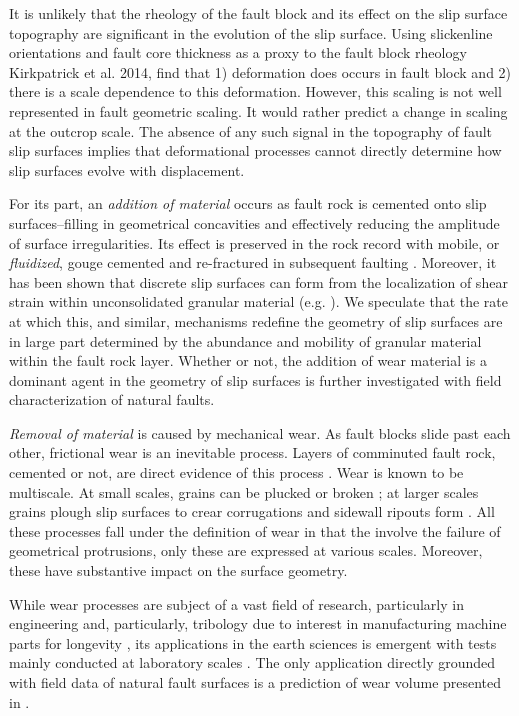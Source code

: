 \documentclass[12pt,a4paper]{article}
\begin{document}
It is unlikely that the rheology of the fault block and its effect on the slip surface topography are significant in the evolution of the slip surface. Using slickenline orientations and fault core thickness as a proxy to the fault block rheology Kirkpatrick et al. 2014, find that 1) deformation does occurs in fault block and 2) there is a scale dependence to this deformation. However, this scaling is not well represented in fault geometric scaling. It would rather predict a change in scaling at the outcrop scale. The absence of any such signal in the topography of fault slip surfaces implies that deformational processes cannot directly determine how slip surfaces evolve with displacement.

For its part, an \textit{addition of material} occurs as fault rock is cemented onto slip surfaces--filling in geometrical concavities and effectively reducing the amplitude of surface irregularities. Its effect is preserved in the rock record with mobile, or \textit{fluidized}, gouge cemented and re-fractured in subsequent faulting \cite{sagy2009geometric, shervais2016smoothing}. Moreover, it has been shown that discrete slip surfaces can form from the localization of shear strain within unconsolidated granular material (e.g. \cite{chambon2006thickness}). We speculate that the rate at which this, and similar, mechanisms redefine the geometry of slip surfaces are in large part  determined by the abundance and mobility of granular material within the fault rock layer. Whether or not, the addition of wear material is a dominant agent in the geometry of slip surfaces is further investigated with field characterization of natural faults. 

\textit{Removal of material} is caused by mechanical wear. As fault blocks slide past each other, frictional wear is an inevitable process. Layers of comminuted fault rock, cemented or not, are direct evidence of this process \cite{power1988roughness, scholz1987wear}. Wear is known to be multiscale. At small scales, grains can be plucked or broken \cite{shervais2016smoothing}; at larger scales grains plough slip surfaces to crear corrugations \cite{scholz1976role} and sidewall ripouts form \cite{swanson1989sidewall}. All these processes fall under the definition of wear in that the involve the failure of geometrical protrusions, only these are expressed at various scales. Moreover, these have substantive impact on the surface geometry.

While wear processes are subject of a vast field of research, particularly in engineering and, particularly, tribology due to interest in manufacturing machine parts for longevity \cite{meng1995wear}, its  applications in the earth sciences is emergent with tests mainly conducted at laboratory scales \cite{power1988roughness, scholz1987wear, wang1994wear, rathburn2013Numerical}. The only application directly grounded with field data of natural fault surfaces is a prediction of wear volume presented in \citet{brodsky2011faults}. 
\end{document}
